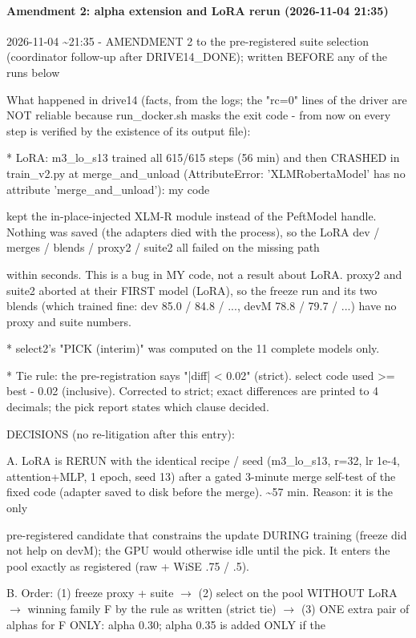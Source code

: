\paragraph{Amendment 2: alpha extension and LoRA rerun (2026-11-04 21:35)}
{\footnotesize\raggedright
2026-11-04 \textasciitilde{}21:35 - AMENDMENT 2 to the pre-registered suite selection (coordinator follow-up after DRIVE14\_DONE); written BEFORE any of the runs below

What happened in drive14 (facts, from the logs; the "rc=0" lines of the driver are NOT reliable because run\_docker.sh masks the exit code - from now on every step is verified by the existence of its output file):

* LoRA: m3\_lo\_s13 trained all 615/615 steps (56 min) and then CRASHED in train\_v2.py at merge\_and\_unload (AttributeError: 'XLMRobertaModel' has no attribute 'merge\_and\_unload'): my code

kept the in-place-injected XLM-R module instead of the PeftModel handle. Nothing was saved (the adapters died with the process), so the LoRA dev / merges / blends / proxy2 / suite2 all failed on the missing path

within seconds. This is a bug in MY code, not a result about LoRA.  proxy2 and suite2 aborted at their FIRST model (LoRA), so the freeze run and its two blends (which trained fine: dev 85.0 / 84.8 / ..., devM 78.8 / 79.7 / ...) have no proxy and suite numbers.

* select2's "PICK (interim)" was computed on the 11 complete models only.

* Tie rule: the pre-registration says "|diff| < 0.02" (strict). select code used >= best - 0.02 (inclusive). Corrected to strict; exact differences are printed to 4 decimals; the pick report states which clause decided.

DECISIONS (no re-litigation after this entry):

A. LoRA is RERUN with the identical recipe / seed (m3\_lo\_s13, r=32, lr 1e-4, attention+MLP, 1 epoch, seed 13) after a gated 3-minute merge self-test of the fixed code (adapter saved to disk before the merge). \textasciitilde{}57 min. Reason: it is the only

pre-registered candidate that constrains the update DURING training (freeze did not help on devM); the GPU would otherwise idle until the pick. It enters the pool exactly as registered (raw + WiSE .75 / .5).

B. Order: (1) freeze proxy + suite  $\to$  (2) select on the pool WITHOUT LoRA $\to$ winning family F by the rule as written (strict tie)  $\to$  (3) ONE extra pair of alphas for F ONLY: alpha 0.30; alpha 0.35 is added ONLY if the

}
